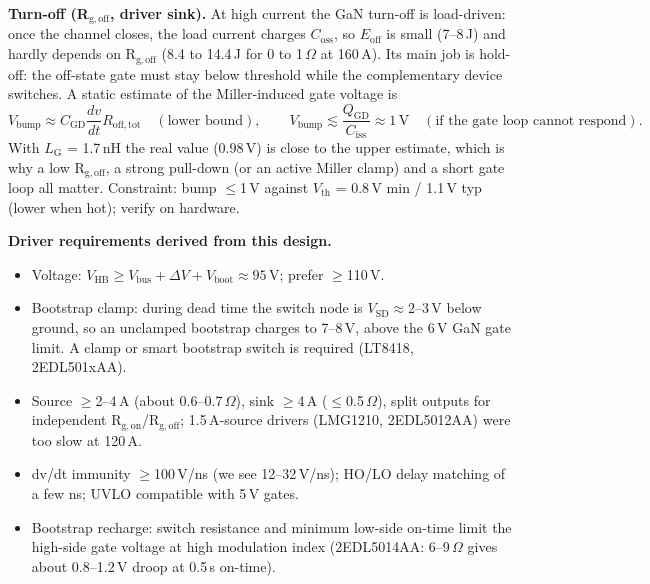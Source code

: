 ﻿\documentclass[10pt,a4paper]{article}
\begin{document}
\textbf{Turn-off (R$_\mathrm{g,off}$, driver sink).} At high current the GaN turn-off is load-driven: once the channel closes, the load current charges $C_\mathrm{oss}$, so $E_\mathrm{off}$ is small (7--8\,\textmu J) and hardly depends on R$_\mathrm{g,off}$ (8.4 to 14.4\,\textmu J for 0 to 1\,$\Omega$ at 160\,A). Its main job is hold-off: the off-state gate must stay below threshold while the complementary device switches. A static estimate of the Miller-induced gate voltage is
\begin{equation}
V_\mathrm{bump}\approx C_\mathrm{GD}\frac{dv}{dt}R_\mathrm{off,tot}\quad(\text{lower bound}),\qquad V_\mathrm{bump}\lesssim\frac{Q_\mathrm{GD}}{C_\mathrm{iss}}\approx1\,\mathrm{V}\quad(\text{if the gate loop cannot respond}).
\end{equation}
With $L_\mathrm{G}$ = 1.7\,nH the real value (0.98\,V) is close to the upper estimate, which is why a low R$_\mathrm{g,off}$, a strong pull-down (or an active Miller clamp) and a short gate loop all matter. Constraint: bump $\leq$1\,V against $V_\mathrm{th}$ = 0.8\,V min / 1.1\,V typ (lower when hot); verify on hardware.

\textbf{Driver requirements derived from this design.}
\begin{itemize}\itemsep0pt
\item Voltage: $V_\mathrm{HB}\geq V_\mathrm{bus}+\Delta V+V_\mathrm{boot}\approx95$\,V; prefer $\geq$110\,V.
\item Bootstrap clamp: during dead time the switch node is $V_\mathrm{SD}\approx2$--3\,V below ground, so an unclamped bootstrap charges to 7--8\,V, above the 6\,V GaN gate limit. A clamp or smart bootstrap switch is required (LT8418, 2EDL501xAA).
\item Source $\geq$2--4\,A (about 0.6--0.7\,$\Omega$), sink $\geq$4\,A ($\leq$0.5\,$\Omega$), split outputs for independent R$_\mathrm{g,on}$/R$_\mathrm{g,off}$; 1.5\,A-source drivers (LMG1210, 2EDL5012AA) were too slow at 120\,A.
\item dv/dt immunity $\geq$100\,V/ns (we see 12--32\,V/ns); HO/LO delay matching of a few ns; UVLO compatible with 5\,V gates.
\item Bootstrap recharge: switch resistance and minimum low-side on-time limit the high-side gate voltage at high modulation index (2EDL5014AA: 6--9\,$\Omega$ gives about 0.8--1.2\,V droop at 0.5\,\textmu s on-time).
\end{itemize}
\end{document}
